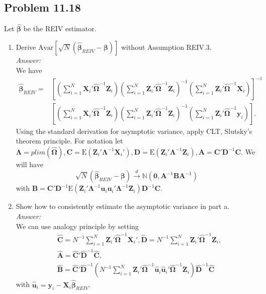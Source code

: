 \documentclass[10pt]{article}
\newcommand\convdist{\xrightarrow{d}}
\newcommand{\N}{\mathbb{N}}
\newcommand{\E}{\text{E}}
\newcommand{\Av}{\text{Avar}}
\begin{document}
\subsection*{Problem 11.18}
Let $\hat{\pmb{\beta}}$ be the REIV estimator.
\begin{enumerate}[label=\alph*.]
\item Derive $\Av[\sqrt{N}(\hat{\pmb{\beta}}_{REIV}-{\pmb{\beta}})]$ without Assumption REIV.3.
\\ \textit{Answer:}\\
We have
\begin{align*}
    \hat{\pmb{\beta}}_{REIV}=&\left[\left(\sum_{i=1}^N\textbf{X}_i'\hat{\pmb\Omega}^{-1}\textbf{Z}_i\right)
    \left(\sum_{i=1}^N\textbf{Z}_i'\hat{\pmb\Omega}^{-1}\textbf{Z}_i\right)^{-1}
    \left(\sum_{i=1}^N\textbf{Z}_i'\hat{\pmb\Omega}^{-1}\textbf{X}_i\right)
    \right]^{-1}\\&\left[\left(\sum_{i=1}^N\textbf{X}_i'\hat{\pmb\Omega}^{-1}\textbf{Z}_i\right)
    \left(\sum_{i=1}^N\textbf{Z}_i'\hat{\pmb\Omega}^{-1}\textbf{Z}_i\right)^{-1}
    \left(\sum_{i=1}^N\textbf{Z}_i'\hat{\pmb\Omega}^{-1}\textbf{y}_i\right)
    \right].
\end{align*}
Using the standard derivation for asymptotic variance, apply CLT, Slutsky's theorem principle. For notation let $\pmb{\Lambda}=plim(\hat{\pmb{\Omega}}), \textbf{C}=\E(\textbf{Z}_i'\pmb{\Lambda}^{-1}\textbf{X}_i'), \textbf{D}=\E(\textbf{Z}_i'\pmb{\Lambda}^{-1}\textbf{Z}_i), \textbf{A}=\textbf{C}'\textbf{D}^{-1}\textbf{C}.$ We will have
\[\sqrt{N}(\hat{\pmb{\beta}}_{REIV}-{\pmb{\beta}})\convdist \N(\textbf{0},\textbf{A}^{-1}\textbf{B}\textbf{A}^{-1})\]
with $\textbf{B}=\textbf{C}'\textbf{D}^{-1}\E(\textbf{Z}_i'\pmb{\Lambda}^{-1}\textbf{u}_i\textbf{u}_i'\pmb{\Lambda}^{-1}\textbf{Z}_i)\textbf{D}^{-1}\textbf{C}$.

\item Show how to consistently estimate the asymptotic variance in part a.
\\ \textit{Answer:}\\
We can use analogy principle by setting \begin{align*}
    &\hat{\textbf{C}}=N^{-1}\sum_{i=1}^N\textbf{Z}_i'\hat{\pmb{\Omega}}^{-1}\textbf{X}_i', \hat{\textbf{D}}=N^{-1}\sum_{i=1}^N\textbf{Z}_i'\hat{\pmb{\Omega}}^{-1}\textbf{Z}_i,\\ &\hat{\textbf{A}}=\hat{\textbf{C}}'\hat{\textbf{D}}^{-1}\hat{\textbf{C}},\\ &\hat{\textbf{B}}=\hat{\textbf{C}}'\hat{\textbf{D}}^{-1}\left(N^{-1}\sum_{i=1}^N\textbf{Z}_i'\hat{\pmb{\Omega}}^{-1}\hat{\textbf{u}}_i\hat{\textbf{u}}_i'\hat{\pmb{\Omega}}^{-1}\textbf{Z}_i\right)\hat{\textbf{D}}^{-1}\hat{\textbf{C}}
\end{align*} with
$\hat{\textbf{u}}_i=\textbf{y}_i-\textbf{X}_i\hat{\pmb{\beta}}_{REIV}$.
\end{enumerate}
\end{document}
